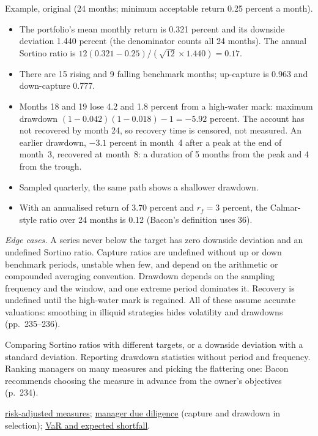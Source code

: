 \begin{qfmethod}
 Example, original (24 months; minimum acceptable return 0.25 percent a month).
\begin{itemize}
\item The portfolio's mean monthly return is 0.321 percent and its downside deviation 1.440 percent (the denominator counts all 24 months). The annual Sortino ratio is $12(0.321-0.25)/(\sqrt{12}\times1.440)=0.17$.
\item There are 15 rising and 9 falling benchmark months; up-capture is 0.963 and down-capture 0.777.
\item Months 18 and 19 lose 4.2 and 1.8 percent from a high-water mark: maximum drawdown $(1-0.042)(1-0.018)-1=-5.92$ percent. The account has not recovered by month 24, so recovery time is censored, not measured. An earlier drawdown, $-3.1$ percent in month~4 after a peak at the end of month~3, recovered at month~8: a duration of 5 months from the peak and 4 from the trough.
\item Sampled quarterly, the same path shows a shallower drawdown.
\item With an annualised return of 3.70 percent and $r_f=3$ percent, the Calmar-style ratio over 24 months is 0.12 (Bacon's definition uses 36).
\end{itemize}

 \emph{Edge cases.} A series never below the target has zero downside deviation and an undefined Sortino ratio. Capture ratios are undefined without up or down benchmark periods, unstable when few, and depend on the arithmetic or compounded averaging convention. Drawdown depends on the sampling frequency and the window, and one extreme period dominates it. Recovery is undefined until the high-water mark is regained. All of these assume accurate valuations: smoothing in illiquid strategies hides volatility and drawdowns (pp.~235--236).

 Comparing Sortino ratios with different targets, or a downside deviation with a standard deviation. Reporting drawdown statistics without period and frequency. Ranking managers on many measures and picking the flattering one: Bacon recommends choosing the measure in advance from the owner's objectives (p.~234).

 \hyperref[meth:risk-adjusted-performance-measures]{risk-adjusted measures}; \hyperref[meth:manager-due-diligence]{manager due diligence} (capture and drawdown in selection); \hyperref[meth:var-es-estimation-methods]{VaR and expected shortfall}.

\end{qfmethod}

